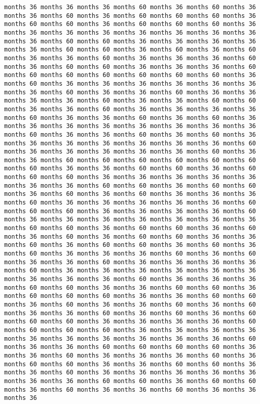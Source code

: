 \documentclass[11pt]{article}
\begin{document}
\begin{Verbatim}[commandchars=\\\{\}, frame=single, framerule=2mm, rulecolor=\color{outerrorbackground}]
months 36 months 36 months 36 months 60 months 36 months 60 months 36 months 36 months 60 months 36 months 60 months 60 months 60 months 36 months 60 months 60 months 36 months 60 months 60 months 60 months 36 months 36 months 36 months 36 months 36 months 36 months 36 months 36 months 36 months 60 months 60 months 36 months 36 months 36 months 36 months 36 months 60 months 60 months 36 months 60 months 36 months 60 months 36 months 36 months 60 months 36 months 36 months 36 months 60 months 36 months 60 months 60 months 36 months 36 months 36 months 60 months 60 months 60 months 60 months 60 months 60 months 60 months 36 months 60 months 36 months 36 months 36 months 36 months 36 months 36 months 36 months 60 months 36 months 36 months 60 months 36 months 36 months 36 months 36 months 60 months 36 months 36 months 60 months 60 months 36 months 36 months 60 months 36 months 36 months 36 months 36 months 60 months 36 months 36 months 60 months 36 months 60 months 36 months 36 months 36 months 36 months 36 months 36 months 36 months 36 months 60 months 36 months 36 months 60 months 36 months 60 months 36 months 36 months 36 months 36 months 36 months 36 months 36 months 60 months 36 months 36 months 36 months 36 months 36 months 60 months 36 months 36 months 60 months 60 months 60 months 60 months 60 months 60 months 60 months 36 months 36 months 60 months 60 months 36 months 60 months 60 months 60 months 36 months 36 months 36 months 36 months 36 months 36 months 36 months 60 months 60 months 36 months 60 months 60 months 36 months 60 months 36 months 60 months 36 months 36 months 36 months 60 months 36 months 36 months 36 months 36 months 36 months 60 months 60 months 60 months 36 months 36 months 36 months 36 months 60 months 36 months 36 months 36 months 36 months 36 months 36 months 36 months 60 months 60 months 36 months 60 months 60 months 36 months 60 months 36 months 60 months 36 months 60 months 60 months 36 months 36 months 60 months 36 months 60 months 60 months 36 months 60 months 36 months 60 months 36 months 36 months 36 months 60 months 36 months 60 months 36 months 36 months 60 months 36 months 36 months 36 months 36 months 60 months 36 months 36 months 36 months 36 months 36 months 36 months 36 months 36 months 36 months 60 months 36 months 36 months 36 months 60 months 60 months 36 months 36 months 60 months 60 months 36 months 60 months 60 months 60 months 36 months 36 months 60 months 60 months 36 months 60 months 36 months 36 months 60 months 36 months 60 months 36 months 36 months 60 months 36 months 60 months 36 months 60 months 60 months 60 months 36 months 36 months 36 months 36 months 60 months 60 months 60 months 60 months 36 months 36 months 36 months 36 months 36 months 36 months 36 months 36 months 36 months 36 months 60 months 36 months 36 months 60 months 60 months 60 months 60 months 36 months 36 months 60 months 36 months 36 months 36 months 60 months 36 months 60 months 60 months 36 months 36 months 60 months 60 months 36 months 36 months 60 months 36 months 36 months 36 months 36 months 36 months 36 months 36 months 60 months 60 months 36 months 60 months 60 months 36 months 60 months 36 months 36 months 60 months 36 months 36 months 36 
\end{Verbatim}
\end{document}
